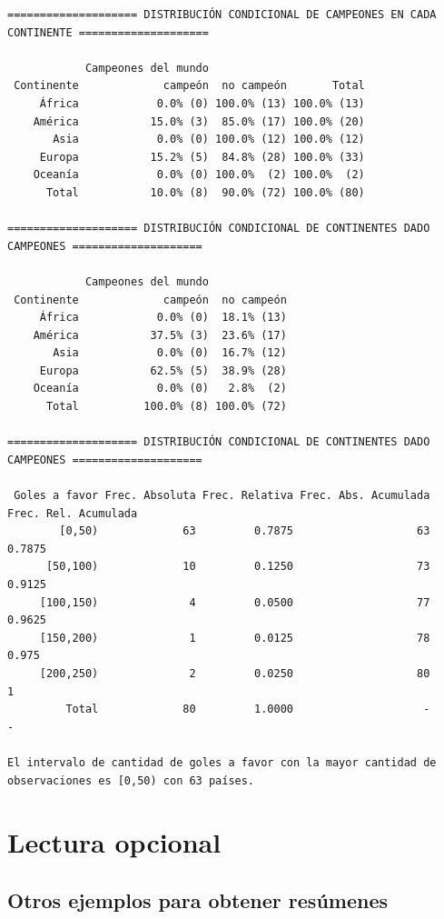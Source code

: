 \documentclass[
]{book}
\begin{document}
\begin{verbatim}
==================== DISTRIBUCIÓN CONDICIONAL DE CAMPEONES EN CADA CONTINENTE ====================

            Campeones del mundo                        
 Continente             campeón  no campeón       Total
     África            0.0% (0) 100.0% (13) 100.0% (13)
    América           15.0% (3)  85.0% (17) 100.0% (20)
       Asia            0.0% (0) 100.0% (12) 100.0% (12)
     Europa           15.2% (5)  84.8% (28) 100.0% (33)
    Oceanía            0.0% (0) 100.0%  (2) 100.0%  (2)
      Total           10.0% (8)  90.0% (72) 100.0% (80)

==================== DISTRIBUCIÓN CONDICIONAL DE CONTINENTES DADO CAMPEONES ====================

            Campeones del mundo            
 Continente             campeón  no campeón
     África            0.0% (0)  18.1% (13)
    América           37.5% (3)  23.6% (17)
       Asia            0.0% (0)  16.7% (12)
     Europa           62.5% (5)  38.9% (28)
    Oceanía            0.0% (0)   2.8%  (2)
      Total          100.0% (8) 100.0% (72)

==================== DISTRIBUCIÓN CONDICIONAL DE CONTINENTES DADO CAMPEONES ====================

 Goles a favor Frec. Absoluta Frec. Relativa Frec. Abs. Acumulada Frec. Rel. Acumulada
        [0,50)             63         0.7875                   63               0.7875
      [50,100)             10         0.1250                   73               0.9125
     [100,150)              4         0.0500                   77               0.9625
     [150,200)              1         0.0125                   78                0.975
     [200,250)              2         0.0250                   80                    1
         Total             80         1.0000                    -                    -

El intervalo de cantidad de goles a favor con la mayor cantidad de observaciones es [0,50) con 63 países.
\end{verbatim}

\hypertarget{lectura-opcional}{%
\section{Lectura opcional}\label{lectura-opcional}}

\hypertarget{otros-ejemplos-para-obtener-resuxfamenes}{%
\subsection{Otros ejemplos para obtener resúmenes}\label{otros-ejemplos-para-obtener-resuxfamenes}}
\end{document}
